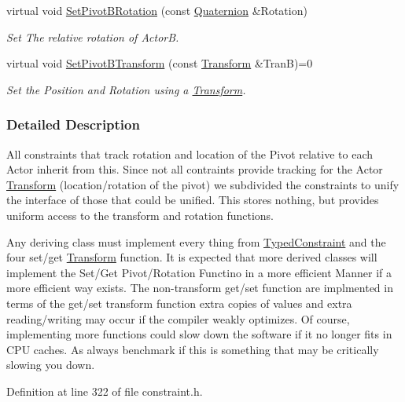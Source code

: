 \begin{DoxyCompactItemize}
virtual void \hyperlink{classMezzanine_1_1DualTransformConstraint_ab25460e03f187dd56657e43e6302ef45}{SetPivotBRotation} (const \hyperlink{classMezzanine_1_1Quaternion}{Quaternion} \&Rotation)
\begin{DoxyCompactList}\small\item\em Set The relative rotation of ActorB. \item\end{DoxyCompactList}\item 
virtual void \hyperlink{classMezzanine_1_1DualTransformConstraint_ac5ee69ce5d68f4e299e7916f764ee396}{SetPivotBTransform} (const \hyperlink{classMezzanine_1_1Transform}{Transform} \&TranB)=0
\begin{DoxyCompactList}\small\item\em Set the Position and Rotation using a \hyperlink{classMezzanine_1_1Transform}{Transform}. \item\end{DoxyCompactList}\end{DoxyCompactItemize}


\subsubsection{Detailed Description}
All constraints that track rotation and location of the Pivot relative to each Actor inherit from this. Since not all contraints provide tracking for the Actor \hyperlink{classMezzanine_1_1Transform}{Transform} (location/rotation of the pivot) we subdivided the constraints to unify the interface of those that could be unified. This stores nothing, but provides uniform access to the transform and rotation functions. \par
 \par
 Any deriving class must implement every thing from \hyperlink{classMezzanine_1_1TypedConstraint}{TypedConstraint} and the four set/get \hyperlink{classMezzanine_1_1Transform}{Transform} function. It is expected that more derived classes will implement the Set/Get Pivot/Rotation Functino in a more efficient Manner if a more efficient way exists. The non-\/transform get/set function are implmented in terms of the get/set transform function extra copies of values and extra reading/writing may occur if the compiler weakly optimizes. Of course, implementing more functions could slow down the software if it no longer fits in CPU caches. As always benchmark if this is something that may be critically slowing you down. 

Definition at line 322 of file constraint.h.



